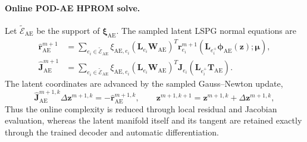 \documentclass[11pt]{article}
\begin{document}
\paragraph{Online POD-AE HPROM solve.}
Let $\widetilde{\mathcal E}_{\mathrm{AE}}$ be the support of
$\boldsymbol\xi_{\mathrm{AE}}$. The sampled latent LSPG normal equations are
\begin{equation}
\begin{aligned}
\widehat{\mathbf r}_{\mathrm{AE}}^{m+1}
&=
\sum_{e_i\in\widetilde{\mathcal E}_{\mathrm{AE}}}\xi_{\mathrm{AE},e_i}
\left(\mathbf L_{e_i}\mathbf W_{\mathrm{AE}}\right)^T
\mathbf r_{e_i}^{m+1}
\!\left(\mathbf L_{e_i^+}\boldsymbol\phi_{\mathrm{AE}}(\mathbf z);\bm\mu\right),\\
\widehat{\mathbf J}_{\mathrm{AE}}^{m+1}
&=
\sum_{e_i\in\widetilde{\mathcal E}_{\mathrm{AE}}}\xi_{\mathrm{AE},e_i}
\left(\mathbf L_{e_i}\mathbf W_{\mathrm{AE}}\right)^T
\mathbf J_{e_i}
\left(\mathbf L_{e_i^+}\mathbf T_{\mathrm{AE}}\right).
\end{aligned}
\label{eq:podae-ecm-online-normal-equations}
\end{equation}
The latent coordinates are advanced by the sampled Gauss--Newton update,
\begin{equation}
\widehat{\mathbf J}_{\mathrm{AE}}^{m+1,k}\Delta\mathbf z^{m+1,k}
=-\widehat{\mathbf r}_{\mathrm{AE}}^{m+1,k},
\qquad
\mathbf z^{m+1,k+1}
=\mathbf z^{m+1,k}+\Delta\mathbf z^{m+1,k},
\label{eq:podae-ecm-online}
\end{equation}
Thus the online complexity is reduced through local residual and Jacobian
evaluation, whereas the latent manifold itself and its tangent are retained
exactly through the trained decoder and automatic differentiation.
\end{document}
